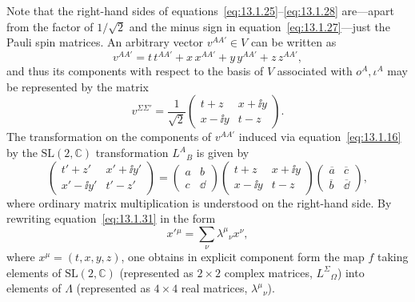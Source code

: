 Note that the right-hand sides of equations~\eqref{eq:13.1.25}--\eqref{eq:13.1.28}
are---apart from the factor of \(1/\sqrt2\) and the minus sign in
equation~\eqref{eq:13.1.27}---just the Pauli spin matrices. An arbitrary vector
\(v^{AA'}\in V\) can be written as
\begin{equation}
  v^{AA'}=t\,t^{AA'}+x\,x^{AA'}+y\,y^{AA'}+z\,z^{AA'},
  \tag{13.1.29}\label{eq:13.1.29}
\end{equation}
and thus its components with respect to the basis of \(V\) associated with
\(o^A,\iota^A\) may be represented by the matrix
\begin{equation}
  v^{\Sigma\Sigma'}=\frac1{\sqrt2}
  \begin{pmatrix}t+z&x+\ii y\\x-\ii y&t-z\end{pmatrix}.
  \tag{13.1.30}\label{eq:13.1.30}
\end{equation}
The transformation on the components of \(v^{AA'}\) induced via
equation~\eqref{eq:13.1.16} by the \(\mathrm{SL}(2,\mathbb C)\) transformation
\(L^A{}_B\) is given by
\begin{equation}
  \begin{pmatrix}t'+z'&x'+\ii y'\\x'-\ii y'&t'-z'\end{pmatrix}
  =
  \begin{pmatrix}a&b\\c&\dd\end{pmatrix}
  \begin{pmatrix}t+z&x+\ii y\\x-\ii y&t-z\end{pmatrix}
  \begin{pmatrix}\overline a&\overline c\\\overline b&\overline \dd\end{pmatrix},
  \tag{13.1.31}\label{eq:13.1.31}
\end{equation}
where ordinary matrix multiplication is understood on the right-hand side. By
rewriting equation~\eqref{eq:13.1.31} in the form
\begin{equation}
  x'{}^\mu=\sum_\nu\lambda^\mu{}_\nu x^\nu,
  \tag{13.1.32}\label{eq:13.1.32}
\end{equation}
where \(x^\mu=(t,x,y,z)\), one obtains in explicit component form the map \(f\)
taking elements of \(\mathrm{SL}(2,\mathbb C)\) (represented as \(2\times2\) complex
matrices, \(L^\Sigma{}_\Omega\)) into elements of \(\Lambda\) (represented as
\(4\times4\) real matrices, \(\lambda^\mu{}_\nu\)).

